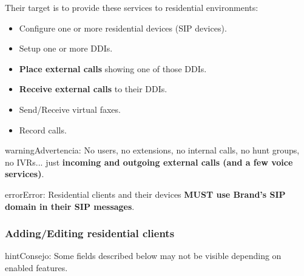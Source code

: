 \documentclass[letterpaper,10pt,spanish]{sphinxmanual}
\begin{document}
Their target is to provide these services to residential environments:
\begin{itemize}
\item {} 
Configure one or more residential devices (SIP devices).

\item {} 
Setup one or more DDIs.

\item {} 
\textbf{Place external calls} showing one of those DDIs.

\item {} 
\textbf{Receive external calls} to their DDIs.

\item {} 
Send/Receive virtual faxes.

\item {} 
Record calls.

\end{itemize}

\begin{notice}{warning}{Advertencia:}
No users, no extensions, no internal calls, no hunt groups, no IVRs... just \textbf{incoming and outgoing external
calls (and a few voice services)}.
\end{notice}

\begin{notice}{error}{Error:}
Residential clients and their devices \textbf{MUST use Brand's SIP domain in their SIP messages}.
\end{notice}


\subsubsection{Adding/Editing residential clients}
\label{administration_portal/brand/clients/residential:adding-editing-residential-clients}
\begin{notice}{hint}{Consejo:}
Some fields described below may not be visible depending on enabled features.
\end{notice}
\end{document}
